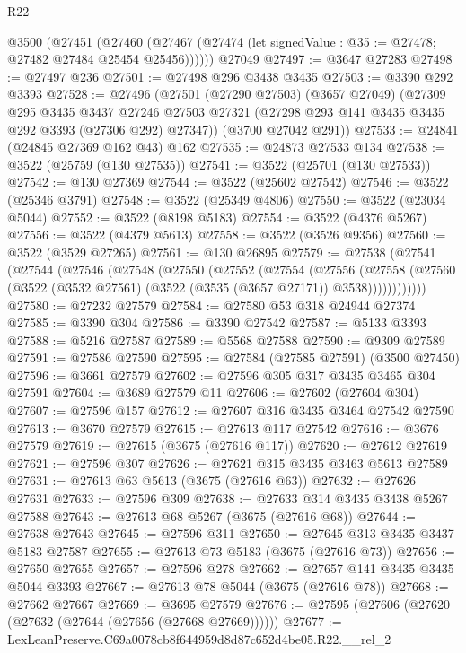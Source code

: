 \begin{lexlean}{R22}
\begin{coremodule}
    @3500
      (@27451
        (@27460 (@27467 (@27474 (let signedValue : @35 := @27478; @27482 @27484 @25454 @25456))))))
    @27049
@27497 := @3647 @27283
@27498 := @27497 @236
@27501 := @27498 @296 @3438 @3435
@27503 := @3390 @292 @3393
@27528 := @27496
    (@27501
      (@27290 @27503)
      (@3657 @27049)
      (@27309
        @295
        @3435
        @3437
        @27246
        @27503
        @27321
        (@27298 @293 @141 @3435 @3435 @292 @3393 (@27306 @292) @27347))
      (@3700 @27042 @291))
@27533 := @24841 (@24845 @27369 @162 @43) @162
@27535 := @24873 @27533 @134
@27538 := @3522 (@25759 (@130 @27535))
@27541 := @3522 (@25701 (@130 @27533))
@27542 := @130 @27369
@27544 := @3522 (@25602 @27542)
@27546 := @3522 (@25346 @3791)
@27548 := @3522 (@25349 @4806)
@27550 := @3522 (@23034 @5044)
@27552 := @3522 (@8198 @5183)
@27554 := @3522 (@4376 @5267)
@27556 := @3522 (@4379 @5613)
@27558 := @3522 (@3526 @9356)
@27560 := @3522 (@3529 @27265)
@27561 := @130 @26895
@27579 := @27538
    (@27541
      (@27544
        (@27546
          (@27548
            (@27550
              (@27552
                (@27554
                  (@27556
                    (@27558
                      (@27560 (@3522 (@3532 @27561) (@3522 (@3535 (@3657 @27171)) @3538))))))))))))
@27580 := @27232 @27579
@27584 := @27580 @53 @318 @24944 @27374
@27585 := @3390 @304
@27586 := @3390 @27542
@27587 := @5133 @3393
@27588 := @5216 @27587
@27589 := @5568 @27588
@27590 := @9309 @27589
@27591 := @27586 @27590
@27595 := @27584 (@27585 @27591) (@3500 @27450)
@27596 := @3661 @27579
@27602 := @27596 @305 @317 @3435 @3465 @304 @27591
@27604 := @3689 @27579 @11
@27606 := @27602 (@27604 @304)
@27607 := @27596 @157
@27612 := @27607 @316 @3435 @3464 @27542 @27590
@27613 := @3670 @27579
@27615 := @27613 @117 @27542
@27616 := @3676 @27579
@27619 := @27615 (@3675 (@27616 @117))
@27620 := @27612 @27619
@27621 := @27596 @307
@27626 := @27621 @315 @3435 @3463 @5613 @27589
@27631 := @27613 @63 @5613 (@3675 (@27616 @63))
@27632 := @27626 @27631
@27633 := @27596 @309
@27638 := @27633 @314 @3435 @3438 @5267 @27588
@27643 := @27613 @68 @5267 (@3675 (@27616 @68))
@27644 := @27638 @27643
@27645 := @27596 @311
@27650 := @27645 @313 @3435 @3437 @5183 @27587
@27655 := @27613 @73 @5183 (@3675 (@27616 @73))
@27656 := @27650 @27655
@27657 := @27596 @278
@27662 := @27657 @141 @3435 @3435 @5044 @3393
@27667 := @27613 @78 @5044 (@3675 (@27616 @78))
@27668 := @27662 @27667
@27669 := @3695 @27579
@27676 := @27595 (@27606 (@27620 (@27632 (@27644 (@27656 (@27668 @27669))))))
@27677 := LexLeanPreserve.C69a0078cb8f644959d8d87c652d4be05.R22.__rel_2

\end{coremodule}
\end{lexlean}
